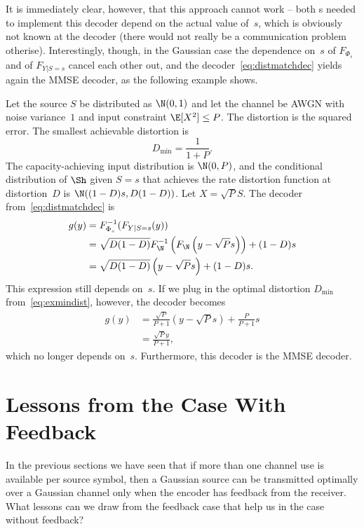 It is immediately clear, however, that this approach cannot work -- both \cdf s
needed to implement this decoder depend on the actual value of~$s$, which is
obviously not known at the decoder (there would not really be a communication
problem otherise). Interestingly, though, in the Gaussian case the dependence
on~$s$ of $F_{\Phi_s}$ and of $F_{Y|S=s}$ cancel each other out, and the
decoder~\eqref{eq:distmatchdec} yields again the MMSE decoder, as the following
example shows.

\begin{example}
  Let the source $S$ be distributed as $\N(0,1)$ and let the channel be AWGN
  with noise variance~$1$ and input constraint $\E[X^2] \le P$.
  The distortion is the squared error. The smallest achievable distortion is
  \begin{equation}
    \label{eq:exmindist}
    D_{\min} = \frac{1}{1 + P}.
  \end{equation}
  The capacity-achieving input distribution is $\N(0,P)$, and the conditional
  distribution of $\Sh$ given $S=s$ that achieves the rate distortion function
  at distortion~$D$ is $\N((1-D)s, D(1-D))$.
  Let $X = \sqrt{P}S$.  The decoder from~\eqref{eq:distmatchdec} is
  \begin{align*}
    g(y) &= F_{\Phi_s}^{-1} (F_{Y|S=s}(y)) \\
    &= \sqrt{D(1-D)} F_{\N}^{-1} \left( F_{\N}\left( y-\sqrt{P}s
    \right) \right) + (1-D)s \\
    &= \sqrt{D(1-D)} \left( y-\sqrt{P}s \right) + (1-D)s.
  \end{align*}
  This expression still depends on~$s$. If we plug in the optimal distortion
  $D_{\min}$ from~\eqref{eq:exmindist}, however, the decoder becomes
  \begin{align*}
    g(y) &= \frac{\sqrt{P}}{P+1} (y - \sqrt{P}s) + \frac{P}{P +
    1}s \\ 
    &= \frac{\sqrt{P}y}{P + 1},
  \end{align*}
  which no longer depends on~$s$. Furthermore, this decoder is the MMSE decoder.
\end{example}


\section{Lessons from the Case With Feedback}

In the previous sections we have seen that if more than one channel use is
available per source symbol, then a Gaussian source can be transmitted optimally
over a Gaussian channel only when the encoder has feedback from the receiver.
What lessons can we draw from the feedback case that help us in the case without
feedback?

